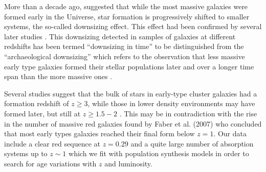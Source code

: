 \documentclass[referee]{aa}
\begin{document}
More than a decade ago, \cite{Cowie:1996p4930} suggested that
while the most massive galaxies were formed early
in the Universe, star formation is progressively shifted to smaller systems,
the so-called downsizing effect. This effect had been confirmed
by several later studies \citep{Kodama:2004p5056, Bell:2005p4431}.
This downsizing detected in samples of galaxies at different redshifts has been termed ``downsizing in time''
to be distinguished from the ``archaeological downsizing'' which refers to the observation that less massive early 
type galaxies formed their stellar populations later and over a longer time span
than the more massive ones \citep{Thomas:2005p5302, Clemens:2006p5321}.

Several studies suggest that the bulk of 
stars in  early-type cluster galaxies had a formation redshift of $z \geq 3$, 
while those in lower density environments may have formed later, but still at 
$z \geq 1.5-2$ \citep[for reviews see][]{Renzini:2006p5117, Renzini:2007p5120}. 
This may be in contradiction with the rise in the number of massive red galaxies
found by Faber et al. (2007) who concluded that most early types galaxies reached
their final form below $z =1$. Our data include a clear red sequence at  $z = 0.29$ 
and a quite large number of absorption systems up to $z \sim 1$ which we fit
with population synthesis models in order to search for age variations with
$z$ and luminosity.
\end{document}
